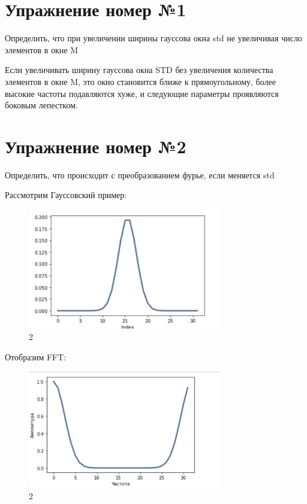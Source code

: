 \documentclass[10pt,a4paper,oneside]{article}
\begin{document}
\section{Упражнение номер №1}

Определить, что при увеличении ширины гауссова окна std не увеличивая число элементов в окне M

Если увеличивать ширину гауссова окна STD без увеличения количества элементов в окне M, это окно становится ближе к прямоугольному, более высокие частоты подавляются хуже, и следующие параметры проявляются боковым лепестком.

\section{Упражнение номер №2}

Определить, что происходит с преобразованием фурье, если меняется std

Рассмотрим Гауссовский пример:

\begin{figure}[H]
        \centering
        \includegraphics[width=0.75\textwidth]{pics/1.png}
        \caption{2}
        \label{fig:first}
\end{figure}

Отобразим FFT:

\begin{figure}[H]
        \centering
        \includegraphics[width=0.75\textwidth]{pics/2.png}
        \caption{2}
        \label{fig:first}
\end{figure}
\end{document}
